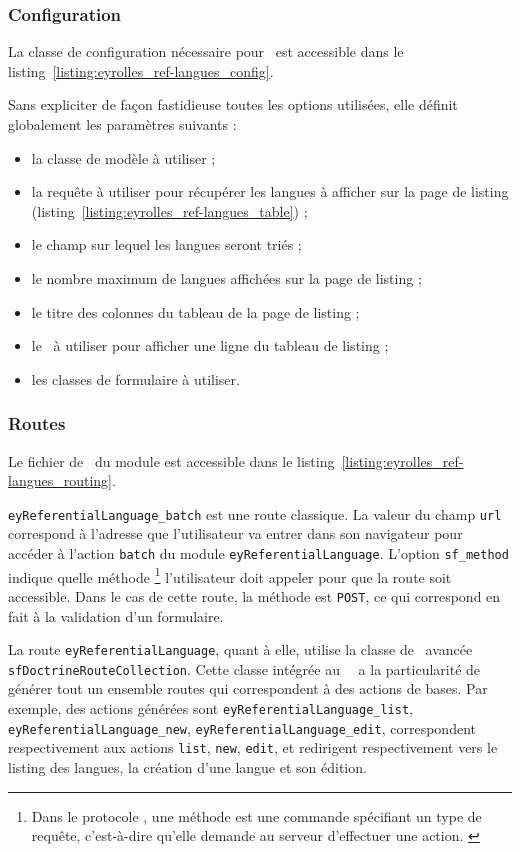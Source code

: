 \subsubsection{Configuration}

La classe de configuration nécessaire pour \asladmin\ est accessible dans le listing~\ref{listing:eyrolles_ref-langues_config}.

Sans expliciter de façon fastidieuse toutes les options utilisées, elle définit globalement les paramètres suivants :

\begin{itemize}
	\item la classe de modèle à utiliser ;
	\item la requête à utiliser pour récupérer les langues à afficher sur la page de listing (listing~\ref{listing:eyrolles_ref-langues_table}) ;
	\item le champ sur lequel les langues seront triés ;
	\item le nombre maximum de langues affichées sur la page de listing ;
	\item le titre des colonnes du tableau de la page de listing ;
	\item le \apartial\ à utiliser pour afficher une ligne du tableau de listing ;
	\item les classes de formulaire à utiliser.
\end{itemize}


\subsubsection{Routes}

Le fichier de \arouting\ du module est accessible dans le listing~\ref{listing:eyrolles_ref-langues_routing}.

\texttt{eyReferentialLanguage\_batch} est une route classique. La valeur du champ \texttt{url} correspond à l'adresse que l'utilisateur va entrer dans son navigateur pour accéder à l'action \texttt{batch} du module \texttt{eyReferentialLanguage}. L'option \texttt{sf\_method} indique quelle méthode \ahttp\footnote{Dans le protocole \ahttp, une méthode est une commande spécifiant un type de requête, c'est-à-dire qu'elle demande au serveur d'effectuer une action. \cite{http}} l'utilisateur doit appeler pour que la route soit accessible. Dans le cas de cette route, la méthode est \texttt{POST}, ce qui correspond en fait à la validation d'un formulaire.

La route \texttt{eyReferentialLanguage}, quant à elle, utilise la classe de \arouting\ avancée \texttt{sfDoctrineRouteCollection}. Cette classe intégrée au \afm\ \asf\ a la particularité de générer tout un ensemble routes qui correspondent à des actions de bases. Par exemple, des actions générées sont \texttt{ey\-Re\-fe\-ren\-tial\-Lan\-guage\_\-list}, \texttt{ey\-Re\-fe\-ren\-tial\-Lan\-guage\_\-new}, \texttt{ey\-Re\-fe\-ren\-tial\-Lan\-guage\_\-edit}, correspondent respectivement aux actions \texttt{list}, \texttt{new}, \texttt{edit}, et redirigent respectivement vers le listing des langues, la création d'une langue et son édition.


